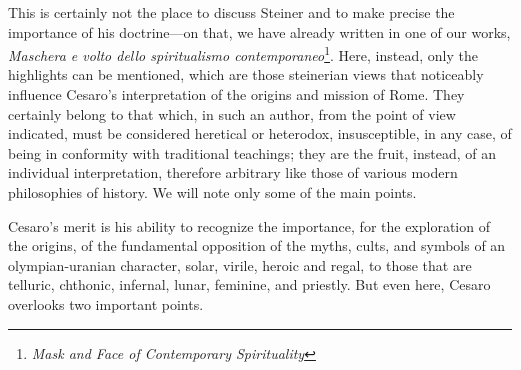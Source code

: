 This is certainly not the place to discuss Steiner and to make precise the importance of his doctrine—on that, we have already written in one of our works, \textit{Maschera e volto dello spiritualismo contemporaneo}\footnote{\textit{Mask and Face of Contemporary Spirituality}}. Here, instead, only the highlights can be mentioned, which are those steinerian views that noticeably influence Cesaro's interpretation of the origins and mission of Rome. They certainly belong to that which, in such an author, from the point of view indicated, must be considered heretical or heterodox, insusceptible, in any case, of being in conformity with traditional teachings; they are the fruit, instead, of an individual interpretation, therefore arbitrary like those of various modern philosophies of history. We will note only some of the main points.

Cesaro's merit is his ability to recognize the importance, for the exploration of the origins, of the fundamental opposition of the myths, cults, and symbols of an olympian-uranian character, solar, virile, heroic and regal, to those that are telluric, chthonic, infernal, lunar, feminine, and priestly. But even here, Cesaro overlooks two important points.

